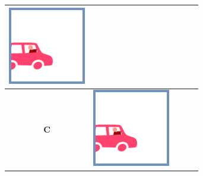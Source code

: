 \documentclass[12pt]{article}
\begin{document}
\begin{minipage}{\textwidth}
\begin{table}[H]
\begin{tabulary}{\linewidth}{|C|CCCC|}
				\vspace{0.01cm}\includegraphics[width=\linewidth]{option1}
				\\ \hline
				\textbf{C} &
				\vspace{0.01cm}\includegraphics[width=\linewidth]{option1} &

\end{tabulary}
\end{table}
\end{minipage}
\end{document}
